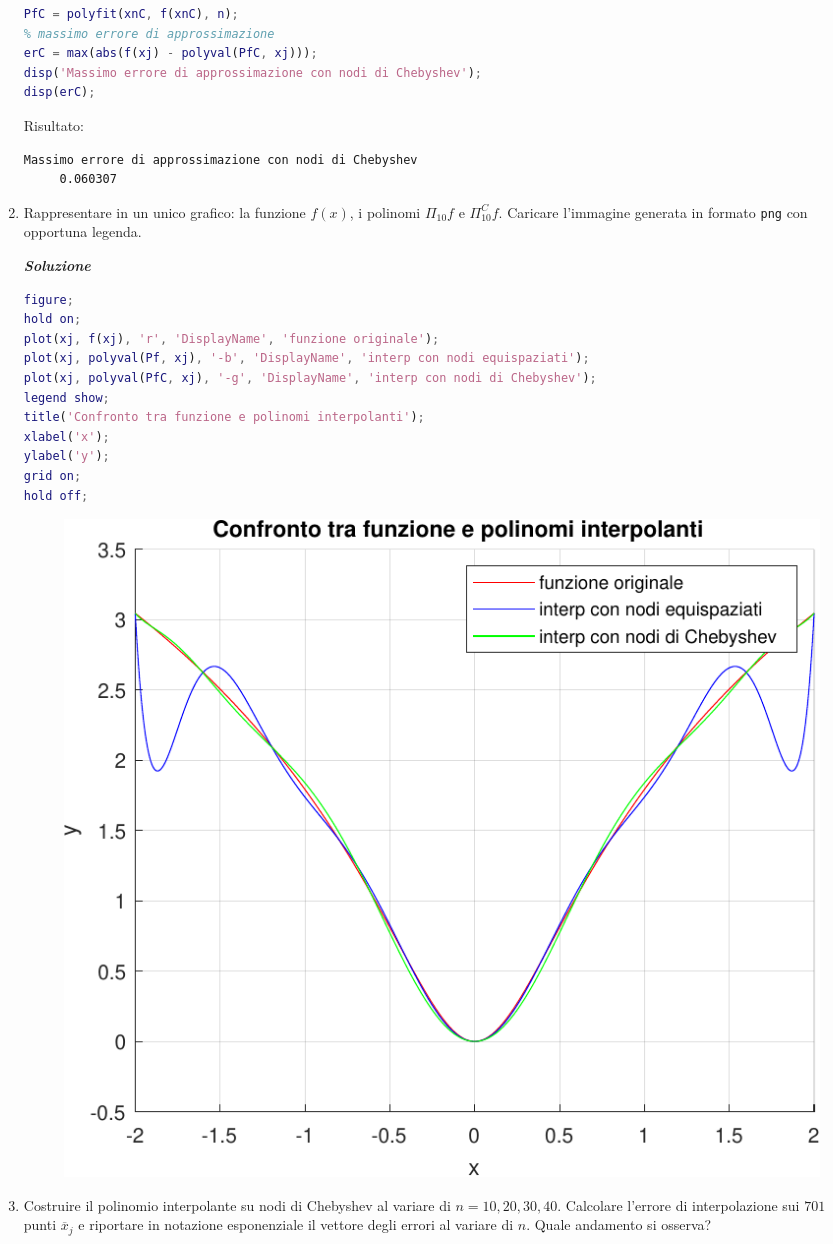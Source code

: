 \begin{enumerate}
\begin{lstlisting}[language=MATLAB]
% polinomio interpolante di grado n sui nodi di Chebyshev
PfC = polyfit(xnC, f(xnC), n);
% massimo errore di approssimazione
erC = max(abs(f(xj) - polyval(PfC, xj)));
disp('Massimo errore di approssimazione con nodi di Chebyshev');
disp(erC);\end{lstlisting}
    Risultato:
    \begin{lstlisting}
Massimo errore di approssimazione con nodi di Chebyshev
     0.060307\end{lstlisting}


    \item Rappresentare in un unico grafico: la funzione $f(x)$, i polinomi $\Pi_{10}f$ e $\Pi_{10}^{C}f$. Caricare l'immagine generata in formato \texttt{png} con opportuna legenda.
    
    \textcolor{Green3}{\textbf{\emph{Soluzione}}}

    \begin{lstlisting}[language=MATLAB]
figure;
hold on;
plot(xj, f(xj), 'r', 'DisplayName', 'funzione originale');
plot(xj, polyval(Pf, xj), '-b', 'DisplayName', 'interp con nodi equispaziati');
plot(xj, polyval(PfC, xj), '-g', 'DisplayName', 'interp con nodi di Chebyshev');
legend show;
title('Confronto tra funzione e polinomi interpolanti');
xlabel('x');
ylabel('y');
grid on;
hold off;\end{lstlisting}
    \begin{figure}[!htp]
        \centering
        \includegraphics[width=.8\textwidth]{img/24-07-2025/24-07-2025-compare.pdf}
    \end{figure}

    \newpage

    \item Costruire il polinomio interpolante su nodi di Chebyshev al variare di $n = 10, 20, 30, 40$. Calcolare l'errore di interpolazione sui $701$ punti $\overline{x}_{j}$ e riportare in notazione esponenziale il vettore degli errori al variare di $n$. Quale andamento si osserva?
    

\end{enumerate}
